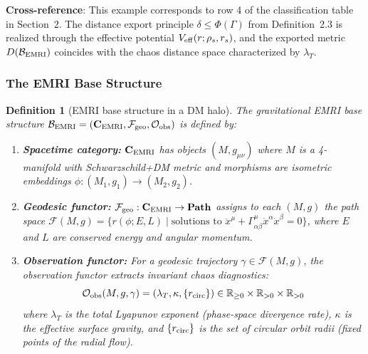 \documentclass[
]{article}
\newtheorem{definition}[theorem]{Definition}
\begin{document}
\textbf{Cross-reference}: This example corresponds to row 4 of the classification table in Section~2. The distance export principle $\delta \leq \Phi(\Gamma)$ from Definition~2.3 is realized through the effective potential $V_{\rm eff}(r; \rho_s, r_s)$, and the exported metric $D(\mathcal{B}_{\rm EMRI})$ coincides with the chaos distance space characterized by $\lambda_T$.

\subsubsection{The EMRI Base Structure}\label{subsec:emri-base}

\begin{definition}[EMRI base structure in a DM halo]\label{def:base-emri}
The gravitational EMRI base structure $\mathcal{B}_{\rm EMRI} = (\mathbf{C}_{\rm EMRI}, \mathcal{F}_{\rm geo}, \mathcal{O}_{\rm obs})$ is defined by:
\begin{enumerate}
\item \textbf{Spacetime category:} $\mathbf{C}_{\rm EMRI}$ has objects $(M, g_{\mu\nu})$ where $M$ is a 4-manifold with Schwarzschild+DM metric and morphisms are isometric embeddings $\phi: (M_1, g_1) \to (M_2, g_2)$.

\item \textbf{Geodesic functor:} $\mathcal{F}_{\rm geo}: \mathbf{C}_{\rm EMRI} \to \mathbf{Path}$ assigns to each $(M, g)$ the path space $\mathcal{F}(M, g) = \{r(\phi; E, L) \mid \text{solutions to } \ddot{x}^\mu + \Gamma^\mu_{\alpha\beta}\dot{x}^\alpha\dot{x}^\beta = 0\}$, where $E$ and $L$ are conserved energy and angular momentum.

\item \textbf{Observation functor:} For a geodesic trajectory $\gamma \in \mathcal{F}(M, g)$, the observation functor extracts invariant chaos diagnostics:
\begin{equation}
\mathcal{O}_{\rm obs}(M, g, \gamma) = (\lambda_T, \kappa, \{r_{\rm circ}\}) \in \mathbb{R}_{\geq 0} \times \mathbb{R}_{>0} \times \mathbb{R}_{>0}
\end{equation}
where $\lambda_T$ is the total Lyapunov exponent (phase-space divergence rate), $\kappa$ is the effective surface gravity, and $\{r_{\rm circ}\}$ is the set of circular orbit radii (fixed points of the radial flow).
\end{enumerate}
\end{definition}
\end{document}
